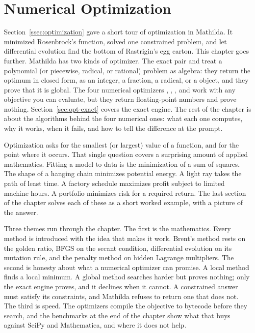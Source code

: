 \chapter{Numerical Optimization}
\label{ch:optimization}

Section~\ref{ssec:optimization} gave a short tour of optimization in Mathilda.
It minimized Rosenbrock's function, solved one constrained problem, and let
differential evolution find the bottom of Rastrigin's egg carton. This chapter
goes further. Mathilda has two kinds of optimizer. The exact pair 
and  treat a polynomial (or piecewise, radical, or rational)
problem as algebra: they return the optimum in closed form, as an integer, a
fraction, a radical, or a  object, and they prove that it is global.
The four numerical optimizers , , ,
and  work with any objective you can evaluate, but they return
floating-point numbers and prove nothing. Section~\ref{sec:opt-exact} covers
the exact engine. The rest of the chapter is about the algorithms behind the
four numerical ones: what each one computes, why it works, when it fails, and
how to tell the difference at the prompt.

Optimization asks for the smallest (or largest) value of a function, and for the
point where it occurs. That single question covers a surprising amount of
applied mathematics. Fitting a model to data is the minimization of a sum of
squares. The shape of a hanging chain minimizes potential energy. A light ray
takes the path of least time. A factory schedule maximizes profit subject to
limited machine hours. A portfolio minimizes risk for a required return. The
last section of the chapter solves each of these as a short worked example,
with a picture of the answer.

Three themes run through the chapter. The first is the mathematics. Every
method is introduced with the idea that makes it work. Brent's method rests on
the golden ratio, BFGS on the secant condition, differential evolution on its
mutation rule, and the penalty method on hidden Lagrange multipliers. The second is
honesty about what a numerical optimizer can promise. A local method finds a
local minimum. A global method searches harder but proves nothing; only the
exact engine proves, and it declines when it cannot. A
constrained answer must satisfy its constraints, and Mathilda refuses to return
one that does not. The third is speed. The optimizers compile the objective to
bytecode before they search, and the benchmarks at the end of the chapter show
what that buys against SciPy and Mathematica, and where it does not help.

